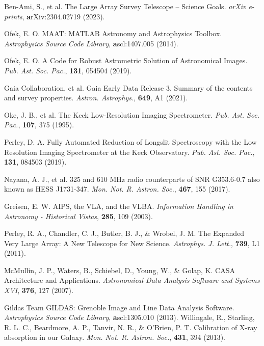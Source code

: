\documentclass{nature_plusfigure}
\newcommand{\mn}{{Mon. Not. R. Astron. Soc.}}
\newcommand{\mnras}{\mn}
\newcommand{\apjl}{{Astrophys. J. Lett.}}
\newcommand{\aap}{{Astron. Astrophys.}}
\newcommand{\pasp}{{Pub. Ast. Soc. Pac.}}
\begin{document}
\begin{methods}
\begin{thebibliography}{10}
 Ben-Ami, S., et al. The Large Array Survey Telescope -- Science Goals. \emph{arXiv e-prints}, \textbf arXiv:2304.02719 (2023). 

 Ofek, E. O. MAAT: MATLAB Astronomy and Astrophysics Toolbox. \emph{Astrophysics Source Code Library}, \textbf ascl:1407.005 (2014). 

 Ofek, E. O. A Code for Robust Astrometric Solution of Astronomical Images. \emph{\pasp}, \textbf{131}, 054504 (2019). 

  Gaia Collaboration, et al. Gaia Early Data Release 3. Summary of the contents and survey properties. \emph{\aap}, \textbf{649}, A1 (2021). 


 Oke, J. B., et al. The Keck Low-Resolution Imaging Spectrometer. \emph{\pasp}, \textbf{107}, 375 (1995). 
 
 Perley, D. A. Fully Automated Reduction of Longslit Spectroscopy with the Low Resolution Imaging Spectrometer at the Keck Observatory. \emph{\pasp}, \textbf{131}, 084503 (2019). 


 Nayana, A. J., et al. 325 and 610 MHz radio counterparts of SNR G353.6-0.7 also known as HESS J1731-347. \emph{\mnras}, \textbf{467}, 155 (2017). 

 Greisen, E. W. AIPS, the VLA, and the VLBA. \emph{Information Handling in Astronomy - Historical Vistas}, \textbf{285}, 109 (2003). 

 Perley, R. A., Chandler, C. J., Butler, B. J., \& Wrobel, J. M. The Expanded Very Large Array: A New Telescope for New Science. \emph{\apjl}, \textbf{739}, L1 (2011). 

 McMullin, J. P., Waters, B., Schiebel, D., Young, W., \& Golap, K. CASA Architecture and Applications. \emph{Astronomical Data Analysis Software and Systems XVI}, \textbf{376}, 127 (2007). 

 Gildas Team GILDAS: Grenoble Image and Line Data Analysis Software. \emph{Astrophysics Source Code Library}, \textbf ascl:1305.010 (2013). 
 Willingale, R., Starling, R. L. C., Beardmore, A. P., Tanvir, N. R., \& O'Brien, P. T. Calibration of X-ray absorption in our Galaxy. \emph{\mnras}, \textbf{431}, 394 (2013). 



\end{thebibliography}
\end{methods}
\end{document}
